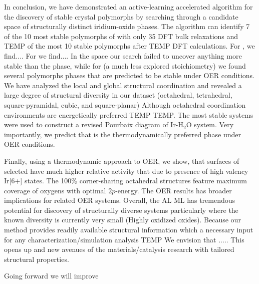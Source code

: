 


%
In conclusion, we have demonstrated an active-learning accelerated algorithm for the discovery of stable crystal polymorphs by searching through a candidate space of structurally distinct iridium-oxide phases.
%
The algorithm can identify \num{7} of the \num{10} most stable polymorphs of \IrOthree with only \num{35} DFT bulk relaxations and TEMP of the most \num{10} stable \IrOtwo polymorphs after TEMP DFT calculations.
%
For \IrOtwo, we find....  For \IrOthree we find....
%
In the \IrOtwo space our search failed to uncover anything more stable than the \rIrOtwo phase,
while for \IrOthree (a much less explored stoichiometry) we found several polymorphs phases that are predicted to be stable under OER conditions.
%
We have analyzed the local and global structural coordination and revealed a large degree of structural diversity in our dataset (octahedral, tetrahedral, square-pyramidal, cubic, and square-planar)
%
Although octahedral coordination environments are energetically preferred TEMP TEMP.
%
The most stable systems were used to construct a revised Pourbaix diagram of Ir-H$_2$O system.
%
Very importantly, we predict that \IrOthree is the thermodynamically preferred phase under OER conditions.

%
Finally, using a thermodynamic approach to OER, we show,
that surfaces of selected \IrOthree have much higher relative activity that \IrOtwo due to presence of high valency Ir[6+] states.
%
The \num{100}\% corner-sharing octahedral structures feature maximum coverage of oxygens with optimal $2p$-energy.
%
The OER results has broader implications for related OER systems.
%
Overall, the AL ML has tremendous potential for discovery of structurally diverse systems particularly where the known diversity is currently very small (Highly oxidized oxides).
%
Because our method provides readily available structural information which a necessary input for any characterization/simulation analysis TEMP We envision that .....
%
This opens up and new avenues of the materials/catalysis research with tailored structural properties.

Going forward we will improve

